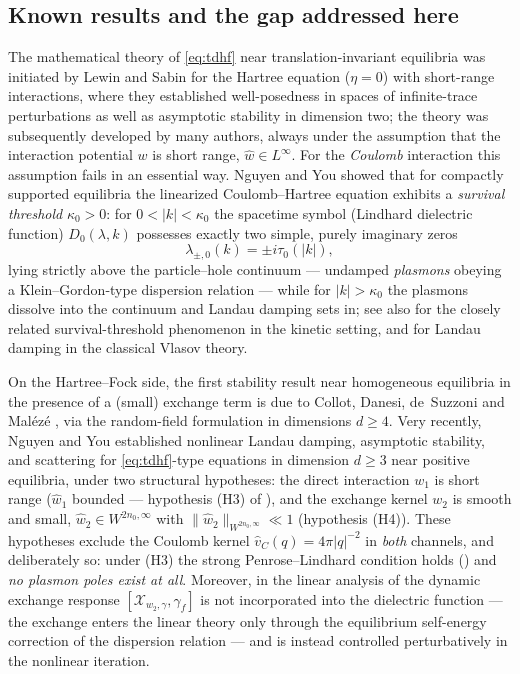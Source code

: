 \documentclass[11pt,a4paper]{amsart}
\theoremstyle{definition}
\theoremstyle{remark}
\newcommand{\sX}{\mathcal{X}}
\begin{document}
\subsection{Known results and the gap addressed here}\label{sec:known}
The mathematical theory of \eqref{eq:tdhf} near translation-invariant equilibria was initiated by Lewin and Sabin \cite{LewinSabin1,LewinSabin2} for the Hartree equation ($\eta=0$) with short-range interactions, where they established well-posedness in spaces of infinite-trace perturbations as well as asymptotic stability in dimension two; the theory was subsequently developed by many authors, always under the assumption that the interaction potential $w$ is short range, $\widehat w\in L^\infty$. For the \emph{Coulomb} interaction this assumption fails in an essential way. Nguyen and You \cite{NY1} showed that for compactly supported equilibria the linearized Coulomb--Hartree equation exhibits a \emph{survival threshold} $\kappa_0>0$: for $0<|k|<\kappa_0$ the spacetime symbol (Lindhard dielectric function) $D_0(\lambda,k)$ possesses exactly two simple, purely imaginary zeros
\[
\lambda_{\pm,0}(k)=\pm i\tau_0(|k|),
\]
lying strictly above the particle--hole continuum --- undamped \emph{plasmons} obeying a Klein--Gordon-type dispersion relation --- while for $|k|>\kappa_0$ the plasmons dissolve into the continuum and Landau damping sets in; see also \cite{NguyenJFA} for the closely related survival-threshold phenomenon in the kinetic setting, and \cite{MouhotVillani,BMM,HKNR} for Landau damping in the classical Vlasov theory.

On the Hartree--Fock side, the first stability result near homogeneous equilibria in the presence of a (small) exchange term is due to Collot, Danesi, de~Suzzoni and Mal\'ez\'e \cite{CDSM}, via the random-field formulation in dimensions $d\ge4$. Very recently, Nguyen and You \cite{NY2} established nonlinear Landau damping, asymptotic stability, and scattering for \eqref{eq:tdhf}-type equations in dimension $d\ge 3$ near positive equilibria, under two structural hypotheses: the direct interaction $w_1$ is short range ($\widehat w_1$ bounded --- hypothesis (H3) of \cite{NY2}), and the exchange kernel $w_2$ is smooth and small, $\widehat w_2\in W^{2n_0,\infty}$ with $\|\widehat w_2\|_{W^{2n_0,\infty}}\ll1$ (hypothesis (H4)). These hypotheses exclude the Coulomb kernel $\widehat v_C(q)=4\pi|q|^{-2}$ in \emph{both} channels, and deliberately so: under (H3) the strong Penrose--Lindhard condition holds (\cite[Theorem~3.3]{NY2}) and \emph{no plasmon poles exist at all}. Moreover, in the linear analysis of \cite{NY2} the dynamic exchange response $[\sX_{w_2,\gamma},\gamma_f]$ is not incorporated into the dielectric function --- the exchange enters the linear theory only through the equilibrium self-energy correction of the dispersion relation --- and is instead controlled perturbatively in the nonlinear iteration.
\end{document}
